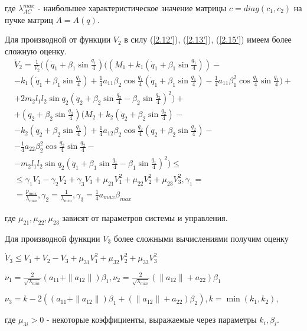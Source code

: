 где $\lambda_{AC}^{max}$ - наибольшее характеристическое значение матрицы $c = diag(c_1, c_2)$ на пучке матриц $A = A(q).$

Для производной от функции $V_2$ в силу (\ref{2.12'}), (\ref{2.13'}), (\ref{2.15'}) имеем более сложную оценку.
$$
\begin{array}{c}
\dot V_2 = \frac{1}{V_2} ((\dot q_1 + \beta_1 \sin \frac{q_1}{4}) ((M_1 + k_1 (\dot q_1 + \beta_1 \sin \frac{q_1}{4})) -\\
- k_1 (\dot q_1 + \beta_1 \sin \frac{q_1}{4}) + \frac{1}{4} a_{11} \beta_2 \cos \frac{q_1}{4} (\dot q_1 + \beta_1 \sin \frac{q_1}{4}) - \frac{1}{4} a_{11} \beta_1^2 \cos \frac{q_1}{4} \sin \frac{q_1}{4}) +\\
+ 2 m_2 l_1 l_2 \sin q_2 (\dot q_2 + \beta_2 \sin \frac{q_2}{4} - \beta_2 \sin \frac{q_2}{4})^2) +\\
+ (\dot q_2 + \beta_2 \sin \frac{q_2}{4}) (M_2 + k_2 (\dot q_2 + \beta_2 \sin \frac{q_2}{4}) -\\
- k_2 (\dot q_2 + \beta_2 \sin \frac{q_1}{4}) + \frac{1}{4} a_{12} \beta_2 \cos \frac{q_2}{4} (\dot q_2 + \beta_2 \sin \frac{q_2}{4}) -\\
- \frac{1}{4} a_{22} \beta_2^2 \cos \frac{q_2}{4} \sin \frac{q_2}{4} -\\
- m_2 l_1 l_2 \sin q_2 (\dot q_1 + \beta_1 \sin \frac{q_1}{4} - \beta_1 \sin \frac{q_1}{4})^2) \le\\
\le \gamma_1 V_1 - \gamma_2 V_2 + \gamma_3 V_3 + \mu_{21} V_1^2 + \mu_{22} V_2^2 + \mu_{23} V_3^2, \gamma_1 =\\
= \frac{p_{max}}{\lambda_{min}}, \gamma_2 = \frac{1}{\lambda_{min}}, \gamma_3 = \frac{1}{4} a_{max} \beta_{max}
\end{array}
$$

где $\mu_{21}, \mu_{22}, \mu_{23}$ зависят от параметров системы и управления.

Для производной функции $V_3$ более сложными вычислениями получим оценку

$\dot V_3 \le V_1 + V_2 - V_3 + \mu_{31} V_1^2 + \mu_{32} V_2^2 + \mu_{33} V_3^2$

$\nu_1 = \frac{2}{\sqrt{\lambda_{min}}} (a_{11} + \| a_{12} \|) \beta_1, \nu_2 = \frac{2}{\sqrt{\lambda_{min}}} (\| a_{12} \| + a_{22}) \beta_1$

$\nu_3 = k - 2 ((a_{11} + \| a_{12} \|) \beta_1 + (\| a_{12} \| + a_{22}) \beta_2), k = \min (k_1, k_2), $

где $\mu_{3i} > 0$ - некоторые коэффициенты, выражаемые через параметры $k_i, \beta_i$.

